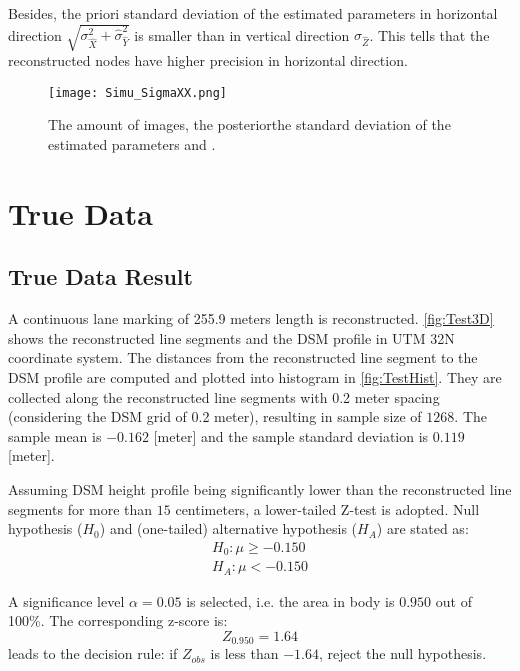 Besides, the priori standard deviation of the estimated parameters in horizontal direction $\sqrt{\sigma_{\hat{X}}^2+\hat{\sigma}_{\hat{Y}}^2}$ is smaller than in vertical direction $\sigma_{\hat{Z}}$. This tells that {the reconstructed nodes have higher precision in horizontal direction}. 

\begin{figure}
  \centering
  \texttt{[image: Simu\_SigmaXX.png]}
  \caption{\small The amount of images, the posteriorthe standard deviation of the estimated parameters and .}
  \label{fig:SimuSigmaxx}
\end{figure}

\clearpage
\section{True Data}
\label{sec:truedata}

\subsection{True Data Result}
\label{subsec:trueresult}

A continuous lane marking of 255.9 meters length is reconstructed. \cref{fig:Test3D} shows the reconstructed line segments and the DSM profile in UTM 32N coordinate system. The distances from the reconstructed line segment to the DSM profile are computed and plotted into histogram in \cref{fig:TestHist}. They are collected along the reconstructed line segments with 0.2 meter spacing (considering the DSM grid of 0.2 meter), resulting in sample size of $1268$. The sample mean is $-0.162$ [meter] and the sample standard deviation is $0.119$ [meter]. %

Assuming DSM height profile being significantly lower than the reconstructed line segments for more than $15$ centimeters, a lower-tailed Z-test is adopted. Null hypothesis ($H_0$) and (one-tailed) alternative hypothesis ($H_A$) are stated as:
\begin{equation*}
\begin{split}
H_0: \mu\geq-0.150\\
H_A: \mu<-0.150
\end{split}
\end{equation*}

A significance level $\alpha=0.05$ is selected, i.e. the area in body is $0.950$ out of 100\%. The corresponding z-score is:
\begin{equation*}
Z_{0.950}=1.64
\end{equation*}
leads to the decision rule: if $Z_{obs}$ is less than $-1.64$, reject the null hypothesis.

